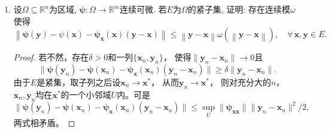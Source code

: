 \begin{quizb}
\begin{enumerate}
\begin{proof}[解答II]
\begin{align*}
    &=2\pi G\rho\int_0^R\left[\int_0^\pi\frac{r\cos\varphi-p}{(r^2+p^2-2rp\cos\varphi)^{3/2}}\sin\varphi\,d\varphi\right]r^2dr.
\end{align*}
记方括号内的积分为$I$，令$q^2=r^2+p^2-2rp\cos\varphi$，
其范围为$|r-p| \leqslant q \leqslant r+p$，则
\[q\,dq=rp\sin\varphi\,d\varphi,\quad q^2-r^2+p^2=2p(p-r\cos\varphi),\]
代入得\begin{align*}
    I&=-\int_{|r-p|}^{r+p}\frac{(q^2-r^2+p^2)/2p}{q^3}\frac{q\,dq}{rp}\\
    &=-\frac{1}{2p^2r}\int_{|r-p|}^{r+p}\Big(1-\frac{r^2-p^2}{q^2}\Big)\,dq\\
    &=-\frac{1}{2p^2r}\left(r+p-|r-p|+r-p-\frac{r^2-p^2}{|r-p|}\right)dq\\
    &=\begin{cases}0,&r \geqslant p\\-2/p^2,&r<p\end{cases}.
\end{align*}
当$p \geqslant R$时，
\[F=-\frac{4\pi G\rho}{p^2}\int_0^Rr^2\,dr=-\frac{4\pi G\rho R^3}{3p^2};\]
当$p<R$时，
\[F=-\frac{4\pi G\rho}{p^2}\int_0^pr^2\,dr=-\frac{4\pi G\rho p}{3}.\qedhere\]
\end{proof}

\item 设\(\varOmega\subseteq\mathbb{R}^n\)为区域, \(\boldsymbol{\psi}:\varOmega\rightarrow\mathbb{R}^m\)连续可微. 
若\(E\)为\(\varOmega\)的紧子集, 证明: 存在连续模\(\omega\)使得
\[\left\|\boldsymbol{\psi}(\boldsymbol{y})-\psi(\boldsymbol{x})-\boldsymbol{\psi}_{\boldsymbol{x}}(\boldsymbol{x})(\boldsymbol{y}-\boldsymbol{x})\right\|
\leqslant\left\|\boldsymbol{y}-\boldsymbol{x}\right\|\omega(\left\|\boldsymbol{y}-\boldsymbol{x}\right\|),\quad\forall\,\boldsymbol{x},\boldsymbol{y}\in E.\]
\begin{proof}
    若不然，存在$\delta>0$和一列$\{\boldsymbol{x}_n,\boldsymbol{y}_n\}$，
    使得$\|\boldsymbol{y}_n-\boldsymbol{x}_n\|\to0$且
    \[\|\boldsymbol{\psi}(\boldsymbol{y}_n)-\boldsymbol{\psi}(\boldsymbol{x}_n)
    -\boldsymbol{\psi_x}(\boldsymbol{x}_n)(\boldsymbol{y}_n-\boldsymbol{x}_n)\|
    \geqslant\delta\|\boldsymbol{y}_n-\boldsymbol{x}_n\|.\]
    由于$E$是紧集，取子列之后设$\boldsymbol{x}_n\to\boldsymbol{x}^*$，
    从而$\boldsymbol{y}_n\to\boldsymbol{x}^*$，
    则对充分大的$n$，$\boldsymbol{x}_n,\boldsymbol{y}_n$均在$\boldsymbol{x}^*$的一个小邻域$U$内。可是
    \[\|\boldsymbol{\psi}(\boldsymbol{y}_n)-\boldsymbol{\psi}(\boldsymbol{x}_n)
    -\boldsymbol{\psi_x}(\boldsymbol{x}_n)(\boldsymbol{y}_n-\boldsymbol{x}_n)\|
    \leqslant\sup_U\|\boldsymbol{\psi_{xx}}\|\|\boldsymbol{y}_n-\boldsymbol{x}_n\|^2/2,\]
    两式相矛盾。
\end{proof}
\end{enumerate}
\end{quizb}

